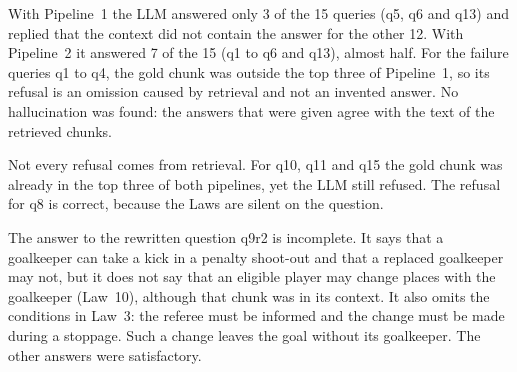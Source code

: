 \documentclass[11pt,a4paper]{article}
\begin{document}
With Pipeline~1 the LLM answered only 3 of the 15 queries (q5, q6 and q13) and replied that the context did not
contain the answer for the other 12. With Pipeline~2 it answered 7 of the 15 (q1 to q6 and q13), almost half. For
the failure queries q1 to q4, the gold chunk was outside the top three of Pipeline~1, so its refusal is an
omission caused by retrieval and not an invented answer. No hallucination was found: the answers that were given
agree with the text of the retrieved chunks.

Not every refusal comes from retrieval. For q10, q11 and q15 the gold chunk was already in the top three of both
pipelines, yet the LLM still refused. The refusal for q8 is correct, because the Laws are silent on the question.

The answer to the rewritten question q9r2 is incomplete. It says that a goalkeeper can take a kick in a penalty
shoot-out and that a replaced goalkeeper may not, but it does not say that an eligible player may change places
with the goalkeeper (Law~10), although that chunk was in its context. It also omits the conditions in Law~3: the
referee must be informed and the change must be made during a stoppage. Such a change leaves the goal without its
goalkeeper. The other answers were satisfactory.
\end{document}
